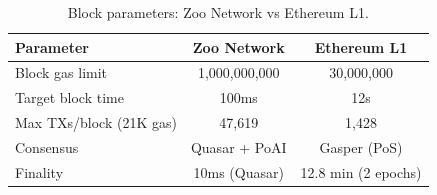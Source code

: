 \begin{table}[t]
\centering
\begin{tabular}{lcc}
\toprule
\textbf{Parameter} & \textbf{Zoo Network} & \textbf{Ethereum L1} \\
\midrule
Block gas limit & 1,000,000,000 & 30,000,000 \\
Target block time & 100ms & 12s \\
Max TXs/block (21K gas) & 47,619 & 1,428 \\
Consensus & Quasar + PoAI & Gasper (PoS) \\
Finality & 10ms (Quasar) & 12.8 min (2 epochs) \\
\bottomrule
\end{tabular}
\caption{Block parameters: Zoo Network vs Ethereum L1.}
\label{tab:params}
\end{table}

